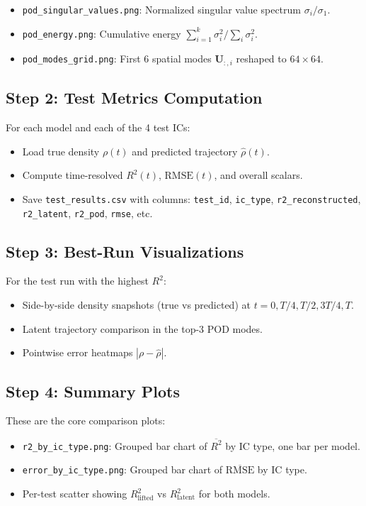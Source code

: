 \documentclass[11pt]{article}
\newcommand{\bU}{\mathbf{U}}
\begin{document}
\begin{itemize}[nosep]
    \item \texttt{pod\_singular\_values.png}: Normalized singular value spectrum $\sigma_i/\sigma_1$.
    \item \texttt{pod\_energy.png}: Cumulative energy $\sum_{i=1}^k \sigma_i^2 / \sum_i \sigma_i^2$.
    \item \texttt{pod\_modes\_grid.png}: First 6 spatial modes $\bU_{:,i}$ reshaped to $64\times64$.
\end{itemize}

\subsection{Step 2: Test Metrics Computation}

For each model and each of the 4 test ICs:
\begin{itemize}[nosep]
    \item Load true density $\rho(t)$ and predicted trajectory $\hat\rho(t)$.
    \item Compute time-resolved $R^2(t)$, $\text{RMSE}(t)$, and overall scalars.
    \item Save \texttt{test\_results.csv} with columns: \texttt{test\_id},
        \texttt{ic\_type}, \texttt{r2\_reconstructed}, \texttt{r2\_latent},
        \texttt{r2\_pod}, \texttt{rmse}, etc.
\end{itemize}

\subsection{Step 3: Best-Run Visualizations}

For the test run with the highest $R^2$:
\begin{itemize}[nosep]
    \item Side-by-side density snapshots (true vs predicted) at $t=0, T/4, T/2, 3T/4, T$.
    \item Latent trajectory comparison in the top-3 POD modes.
    \item Pointwise error heatmaps $|\rho - \hat\rho|$.
\end{itemize}

\subsection{Step 4: Summary Plots}

These are the core comparison plots:
\begin{itemize}[nosep]
    \item \texttt{r2\_by\_ic\_type.png}: Grouped bar chart of $\overline{R^2}$ by IC type,
        one bar per model.
    \item \texttt{error\_by\_ic\_type.png}: Grouped bar chart of $\overline{\text{RMSE}}$ by IC type.
    \item Per-test scatter showing $R^2_{\text{lifted}}$ vs $R^2_{\text{latent}}$
        for both models.
\end{itemize}
\end{document}
